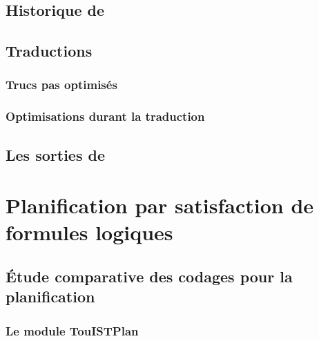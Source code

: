 \documentclass[a4paper,12pt,oneside]{extbook}
\begin{document}
\section{Historique de \touist}








\section{Traductions}
\subsection{Trucs pas optimisés}
\subsection{Optimisations durant la traduction}
\section{Les sorties de \touist}


\chapter{Planification par satisfaction de formules logiques}


\section{Étude comparative des codages pour la planification}

\subsection{Le module TouISTPlan}

\end{document}
